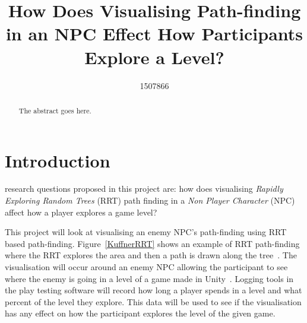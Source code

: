 \documentclass[journal]{IEEEtran}
\begin{document}
%
\title{ How Does Visualising Path-finding in an NPC Effect How Participants Explore a Level?}
%
%
\author{1507866}


\maketitle

\begin{abstract}
The abstract goes here.
\end{abstract}

\section{Introduction}
% 
% 
% 
% 
 research questions proposed in this project are: how does visualising \textit{Rapidly Exploring Random Trees} (RRT) path finding in a \textit{Non Player Character} (NPC) affect how a player explores a game level?

This project will look at visualising an enemy NPC's path-finding using RRT based path-finding. Figure~\ref{KuffnerRRT} shows an example of RRT path-finding where the RRT explores the area and then a path is drawn along the tree~\cite{Kuffner2000}.  The visualisation will occur around an enemy NPC allowing the participant to see where the enemy is going in a level of a game made in Unity~\cite{software:Unity}. Logging tools in the play testing software will record how long a player spends in a level and what percent of the level they explore. This data will be used to see if the visualisation has any effect on how the participant explores the level of the given game. 
\end{document}
